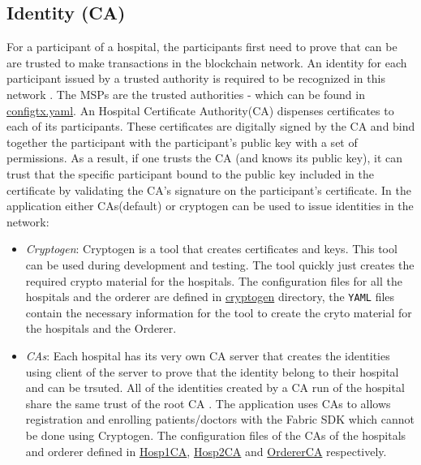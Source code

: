 \subsection{Identity (CA)}
For a participant of a hospital, the participants first need to prove that can be are trusted to make transactions in the blockchain network. An identity for each participant issued by a trusted authority is required to be recognized in this network \cite{Identity}. The MSPs are the trusted authorities - which can be found in \href{https://github.com/kshitijyelpale/blockchain-hyperledger-fabric-electronic-patient-records/blob/main/app/first-network/configtx/configtx.yaml}{configtx.yaml}. An Hospital Certificate Authority(CA) dispenses certificates to each of its participants. These certificates are digitally signed by the CA and bind together the participant with the participant’s public key with a set of permissions. As a result, if one trusts the CA (and knows its public key), it can trust that the specific participant bound to the public key included in the certificate by validating the CA’s signature on the participant’s certificate. In the application either CAs(default) or cryptogen can be used to issue identities in the network: 
\begin{itemize}
    \item \emph{Cryptogen}: Cryptogen is a tool that creates certificates and keys. This tool can be used during development and testing. The tool quickly just creates the required crypto material for the hospitals\cite{Cryptogen}. The configuration files for all the hospitals and the orderer are defined in \href{https://github.com/kshitijyelpale/blockchain-hyperledger-fabric-electronic-patient-records/tree/main/app/first-network/organizations/cryptogen}{cryptogen} directory, the \lstinline{YAML} files contain the necessary information for the tool to create the cryto material for the hospitals and the Orderer.
    \item \emph{CAs}: Each hospital has its very own CA server that creates the identities using client of the server to prove that the identity belong to their hospital and can be trsuted. All of the identities created by a CA run of the hospital share the same trust of the root CA \cite{Identity}. The application uses CAs to allows registration and enrolling patients/doctors with the Fabric SDK which cannot be done using Cryptogen. The configuration files of the CAs of the hospitals and orderer defined in \href{https://github.com/kshitijyelpale/blockchain-hyperledger-fabric-electronic-patient-records/blob/main/app/first-network/organizations/fabric-ca/hosp1/fabric-ca-server-config.yaml}{Hosp1CA}, \href{https://github.com/kshitijyelpale/blockchain-hyperledger-fabric-electronic-patient-records/blob/main/app/first-network/organizations/fabric-ca/hosp2/fabric-ca-server-config.yaml}{Hosp2CA} and \href{https://github.com/kshitijyelpale/blockchain-hyperledger-fabric-electronic-patient-records/blob/main/app/first-network/organizations/fabric-ca/ordererOrg/fabric-ca-server-config.yaml}{OrdererCA} respectively. 
\end{itemize}


